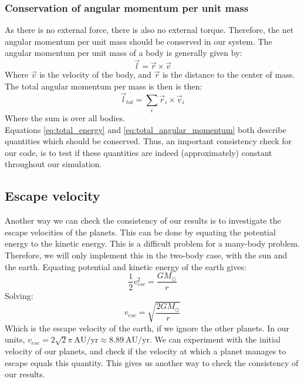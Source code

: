 \documentclass[a4paper, 10pt]{article}
\begin{document}
\subsubsection{Conservation of angular momentum per unit mass}
As there is no external force, there is also no external torque. Therefore, the net angular momentum per unit mass should be conserved in our system. The angular momentum per unit mass of a body is generally given by:
$$\vec{l}=\vec{r}\times \vec{v}$$
Where $\vec{v}$ is the velocity of the body, and $\vec{r}$ is the distance to the center of mass. The total angular momentum per mass is then is then:
\begin{equation}\label{eq:total_angular_momentum}
\vec{l}_{tot}=\sum_i \vec{r}_i\times \vec{v}_i
\end{equation}
Where the sum is over all bodies.\\
\linebreak
Equations \ref{eq:total_energy} and \ref{eq:total_angular_momentum} both describe quantities which should be conserved. Thus, an important consistency check for our code, is to test if these quantities are indeed (approximately) constant throughout our simulation.
\subsection{Escape velocity}\label{escape_vel_section}
Another way we can check the consistency of our results is to investigate the escape velocities of the planets. This can be done by equating the potential energy to the kinetic energy. This is a difficult problem for a many-body problem. Therefore, we will only implement this in  the two-body case, with the sun and the earth. Equating potential and kinetic energy of the earth gives: 
$$\frac{1}{2}v_{esc}^2=\frac{GM_{\odot}}{r}$$
Solving:
\begin{equation}
v_{esc}=\sqrt{\frac{2GM_{\odot}}{r}}
\end{equation}
Which is the escape velocity of the earth, if we ignore the other planets. In our units, $v_{esc} = 2\sqrt{2}\pi\ \mathrm{AU/yr} \approx 8.89 \ \mathrm{AU/yr}$. We can experiment with the initial velocity of our planets, and check if the velocity at which a planet manages to escape equals this quantity. This gives us another way to check the consistency of our results.
\end{document}
